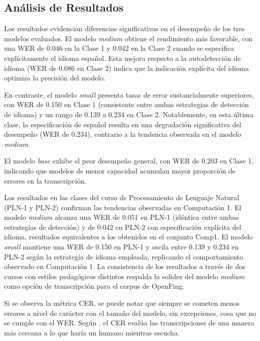 \subsection{Análisis de Resultados}

Los resultados evidencian diferencias significativas en el desempeño de los tres modelos evaluados. El modelo \textit{medium} obtiene el rendimiento más favorable, con una WER de 0.046 en la Clase 1 y 0.042 en la Clase 2 cuando se especifica explícitamente el idioma español. Esta mejora respecto a la autodetección de idioma (WER de 0.086 en Clase 2) indica que la indicación explícita del idioma optimiza la precisión del modelo.

En contraste, el modelo \textit{small} presenta tasas de error sustancialmente superiores, con WER de 0.150 en Clase 1 (consistente entre ambas estrategias de detección de idioma) y un rango de 0.139 a 0.234 en Clase 2. Notablemente, en esta última clase, la especificación de español resulta en una degradación significativa del desempeño (WER de 0.234), contrario a la tendencia observada en el modelo \textit{medium}.

El modelo \textit{base} exhibe el peor desempeño general, con WER de 0.203 en Clase 1, indicando que modelos de menor capacidad acumulan mayor proporción de errores en la transcripción.

Los resultados en las clases del curso de Procesamiento de Lenguaje Natural (PLN-1 y PLN-2) confirman las tendencias observadas en Computación 1. El modelo \textit{medium} alcanza una WER de 0.051 en PLN-1 (idéntica entre ambas estrategias de detección) y de 0.042 en PLN-2 con especificación explícita del idioma, resultados equivalentes a los obtenidos en el conjunto Comp1. El modelo \textit{small} mantiene una WER de 0.150 en PLN-1 y oscila entre 0.139 y 0.234 en PLN-2 según la estrategia de idioma empleada, replicando el comportamiento observado en Computación 1. La consistencia de los resultados a través de dos cursos con estilos pedagógicos distintos respalda la solidez del modelo \textit{medium} como opción de transcripción para el corpus de OpenFing.

Si se observa la métrica CER, se puede notar que siempre se cometen menos errores a nivel de carácter con el tamaño del modelo, sin excepciones, cosa que no se cumple con el WER. Según \cite{itoh2015metric}, el CER evalúa las transcripciones de una manera más cercana a lo que haría un humano mientras escucha. 



